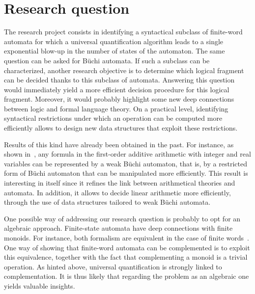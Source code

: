 \documentclass[]{article}
\begin{document}
\section{Research question}

The research project consists in identifying a syntactical subclass of finite-word automata for which a universal quantification algorithm leads to a single exponential blow-up in the number of states of the automaton. The same question can be asked for Büchi automata. If such a subclass can be characterized, another research objective is to determine which logical fragment can be decided thanks to this subclass of automata. Answering this question would immediately yield a more efficient decision procedure for this logical fragment. Moreover, it would probably highlight some new deep connections between logic and formal language theory. On a practical level, identifying syntactical restrictions under which an operation can be computed more efficiently allows to design new data structures that exploit these restrictions.

Results of this kind have already been obtained in the past. For instance, as shown in~\cite{}, any formula in the first-order additive arithmetic with integer and real variables can be represented by a weak Büchi automaton, that is, by a restricted form of Büchi automaton that can be manipulated more efficiently. This result is interesting in itself since it refines the link between arithmetical theories and automata. In addition, it allows to decide linear arithmetic more efficiently, through the use of data structures tailored to weak Büchi automata. 

One possible way of addressing our research question is probably to opt for an algebraic approach. Finite-state automata have deep connections with finite monoids. For instance, both formalism are equivalent in the case of finite words~\cite{}. One way of showing that finite-word automata can be complemented is to exploit this equivalence, together with the fact that complementing a monoid is a trivial operation. As hinted above, universal quantification is strongly linked to complementation. It is thus likely that regarding the problem as an algebraic one yields valuable insights.


\end{document}
